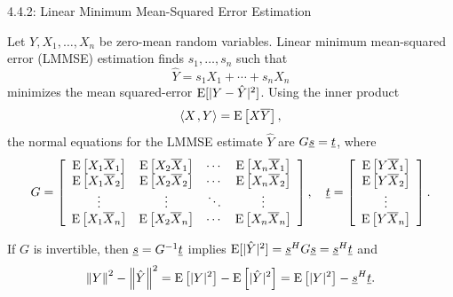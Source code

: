 \documentclass[10pt,english,aspectratio=169]{beamer}
\begin{document}
\begin{frame}{4.4.2: Linear Minimum Mean-Squared Error Estimation}

Let $Y, X_1, \ldots, X_n$ be zero-mean random variables.
Linear minimum mean-squared error (LMMSE) estimation finds $s_1, \ldots, s_n$ such that
\[ \hat{Y} = s_1 X_1 + \cdots + s_n X_n \]
minimizes the mean squared-error $\mathrm{E}[|Y-\hat{Y}|^2]$.
Using the inner product
\begin{equation*}
{\left\langle  X  \mskip2mu ,  Y  \right\rangle} = \mathrm{E} \left[ X \overline{Y} \right],
\end{equation*}
the normal equations for the LMMSE estimate $\hat{Y}$ are $G \underline{s} = \underline{t}$, where
\begin{equation*}
G = \left[ \begin{array}{cccc}
\mathrm{E} \left[ X_1 \overline{X}_1 \right]
& \mathrm{E} \left[ X_2 \overline{X}_1 \right] & \cdots
& \mathrm{E} \left[ X_n \overline{X}_1 \right] \\
\mathrm{E} \left[ X_1 \overline{X}_2 \right]
& \mathrm{E} \left[ X_2 \overline{X}_2 \right] & \cdots
& \mathrm{E} \left[ X_n \overline{X}_2 \right] \\
\vdots & \vdots & \ddots & \vdots \\
\mathrm{E} \left[ X_1 \overline{X}_n \right]
& \mathrm{E} \left[ X_2 \overline{X}_n \right] & \cdots
& \mathrm{E} \left[ X_n \overline{X}_n \right] \\
\end{array} \right], \quad \underline{t} = \left[ \begin{array}{c}
\mathrm{E} \left[ Y \overline{X}_1 \right] \\
\mathrm{E} \left[ Y \overline{X}_2 \right] \\ \vdots \\
\mathrm{E} \left[ Y \overline{X}_n \right] \end{array} \right].
\end{equation*}

If $G$ is invertible, then $\underline{s} = G^{-1} \underline{t}$ implies $\mathrm{E} [|\hat{Y}|^2] = \underline{s}^H G \underline{s} = \underline{s}^H \underline{t}$ and
\begin{equation*}
\left\| Y \right\|^2 - \left\| \hat{Y} \right\|^2 
= \mathrm{E} \left[ |Y|^2 \right]
- \mathrm{E} \left[ |\hat{Y}|^2 \right] = \mathrm{E} \left[ |Y|^2 \right] - \underline{s}^H \underline{t}.
\end{equation*}

\end{frame}
\end{document}
